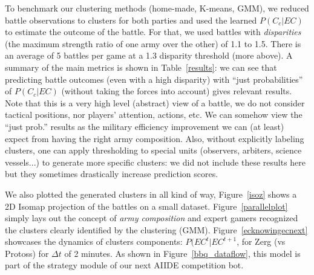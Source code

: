 To benchmark our clustering methods (home-made, K-means, GMM), we reduced battle observations to clusters for both parties and used the learned $P(C_c|EC)$ to estimate the outcome of the battle. For that, we used battles with \textit{disparities} (the maximum strength ratio of one army over the other) of 1.1 to 1.5. There is an average of 5 battles per game at a 1.3 disparity threshold (more above). A summary of the main metrics is shown in Table~\ref{results}: we can see that predicting battle outcomes (even with a high disparity) with ``just probabilities'' of $P(C_c|EC)$ (without taking the forces into account) gives relevant results. Note that this is a very high level (abstract) view of a battle, we do not consider tactical positions, nor players' attention, actions, etc. We can somehow view the ``just prob.'' results as the military efficiency improvement we can (at least) expect from having the right army composition. Also, without explicitly labeling clusters, one can apply thresholding to special units (observers, arbiters, science vessels...) to generate more specific clusters: we did not include these results here but they sometimes drastically increase prediction scores.


We also plotted the generated clusters in all kind of way, Figure~\ref{isoz} shows a 2D Isomap projection of the battles on a small dataset. Figure~\ref{parallelplot} simply lays out the concept of \textit{army composition} and expert gamers recognized the clusters clearly identified by the clustering (GMM). Figure~\ref{ecknowingecnext} showcases the dynamics of clusters components: $P(EC^t|EC^{t+1}$, for Zerg (vs Protoss) for $\Delta t$ of 2 minutes. As shown in Figure~\ref{bbq_dataflow}, this model is part of the strategy module of our next AIIDE competition bot.

